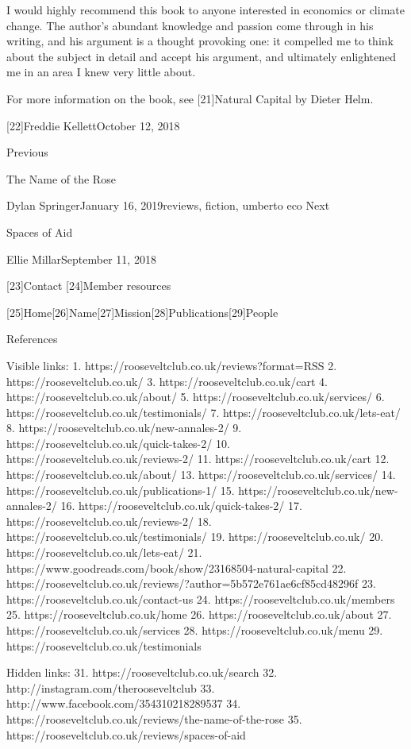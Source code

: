    I would highly recommend this book to anyone interested in economics or
   climate change. The author's abundant knowledge and passion come
   through in his writing, and his argument is a thought provoking one: it
   compelled me to think about the subject in detail and accept his
   argument, and ultimately enlightened me in an area I knew very little
   about.

   For more information on the book, see [21]Natural Capital by Dieter
   Helm.

   [22]Freddie KellettOctober 12, 2018

   Previous

The Name of the Rose

   Dylan SpringerJanuary 16, 2019reviews, fiction, umberto eco
   Next

Spaces of Aid

   Ellie MillarSeptember 11, 2018

   [23]Contact
   [24]Member resources

   [25]Home[26]Name[27]Mission[28]Publications[29]People

References

   Visible links:
   1. https://rooseveltclub.co.uk/reviews?format=RSS
   2. https://rooseveltclub.co.uk/
   3. https://rooseveltclub.co.uk/cart
   4. https://rooseveltclub.co.uk/about/
   5. https://rooseveltclub.co.uk/services/
   6. https://rooseveltclub.co.uk/testimonials/
   7. https://rooseveltclub.co.uk/lets-eat/
   8. https://rooseveltclub.co.uk/new-annales-2/
   9. https://rooseveltclub.co.uk/quick-takes-2/
  10. https://rooseveltclub.co.uk/reviews-2/
  11. https://rooseveltclub.co.uk/cart
  12. https://rooseveltclub.co.uk/about/
  13. https://rooseveltclub.co.uk/services/
  14. https://rooseveltclub.co.uk/publications-1/
  15. https://rooseveltclub.co.uk/new-annales-2/
  16. https://rooseveltclub.co.uk/quick-takes-2/
  17. https://rooseveltclub.co.uk/reviews-2/
  18. https://rooseveltclub.co.uk/testimonials/
  19. https://rooseveltclub.co.uk/
  20. https://rooseveltclub.co.uk/lets-eat/
  21. https://www.goodreads.com/book/show/23168504-natural-capital
  22. https://rooseveltclub.co.uk/reviews/?author=5b572e761ae6cf85cd48296f
  23. https://rooseveltclub.co.uk/contact-us
  24. https://rooseveltclub.co.uk/members
  25. https://rooseveltclub.co.uk/home
  26. https://rooseveltclub.co.uk/about
  27. https://rooseveltclub.co.uk/services
  28. https://rooseveltclub.co.uk/menu
  29. https://rooseveltclub.co.uk/testimonials

   Hidden links:
  31. https://rooseveltclub.co.uk/search
  32. http://instagram.com/therooseveltclub
  33. http://www.facebook.com/354310218289537
  34. https://rooseveltclub.co.uk/reviews/the-name-of-the-rose
  35. https://rooseveltclub.co.uk/reviews/spaces-of-aid
